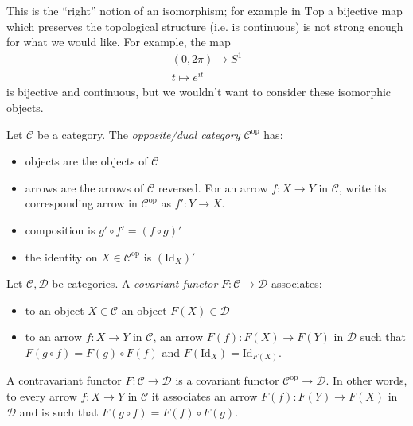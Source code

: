 \documentclass[12pt]{article}
\begin{document}
\begin{example}
	This is the ``right'' notion of an isomorphism; for example in $\text{Top}$ a bijective map which preserves the topological structure (i.e. is continuous) is not strong enough for what we would like. For example, the map 
	\begin{gather*}
		(0,2\pi) \to S^1 \\
		t \mapsto e^{it}
	\end{gather*}
	is bijective and continuous, but we wouldn't want to consider these isomorphic objects.
\end{example}

\begin{definition}
	Let $\mathcal{C}$ be a category. The \emph{opposite/dual category} $\mathcal{C}^{\text{op}}$ has:
	\begin{itemize}
		\item objects are the objects of $\mathcal{C}$
		\item arrows are the arrows of $\mathcal{C}$ reversed. For an arrow $f:X\to Y$ in $\mathcal{C}$, write its corresponding arrow in $\mathcal{C}^{\text{op}}$ as $f':Y\to X$.
		\item composition is $g'\circ f'=(f\circ g)'$
		\item the identity on $X\in\mathcal{C}^{\text{op}}$ is $(\text{Id}_X)'$
	\end{itemize}
\end{definition}

\begin{definition}
	Let $\mathcal{C},\mathcal{D}$ be categories. A \emph{covariant functor} $F:\mathcal{C}\to\mathcal{D}$ associates:
	\begin{itemize}
		\item to an object $X\in\mathcal{C}$ an object $F(X)\in\mathcal{D}$
		\item to an arrow $f:X\to Y$ in $\mathcal{C}$, an arrow $F(f):F(X)\to F(Y)$ in $\mathcal{D}$ such that $F(g\circ f)=F(g)\circ F(f)$ and $F(\text{Id}_X)=\text{Id}_{F(X)}$.
	\end{itemize}
\end{definition}

\begin{definition}
	A contravariant functor $F:\mathcal{C}\to\mathcal{D}$ is a covariant functor $\mathcal{C}^{\text{op}}\to\mathcal{D}$. In other words, to every arrow $f:X\to Y$ in $\mathcal{C}$ it associates an arrow $F(f):F(Y)\to F(X)$ in $\mathcal{D}$ and is such that $F(g\circ f)=F(f)\circ F(g)$.
\end{definition}
\end{document}

